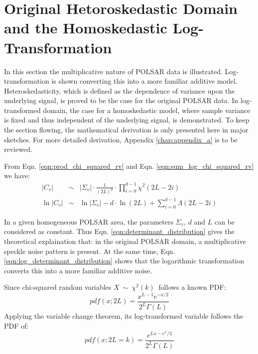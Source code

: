 \documentclass[journal]{IEEEtran}
\begin{document}
\section{Original Hetoroskedastic Domain and the Homoskedastic Log-Transformation}
\label{sec:polsar_heterosked_model_and_log_transform}

In this section the multiplicative nature of POLSAR data is illustrated.
Log-transformation is shown converting this into a more familiar additive model.
Heteroskedasticity, which is defined as the dependence of variance upon the underlying signal,
  is proved to be the case for the original POLSAR data.
In log-transformed domain, the case for a homoskedastic model,
  where sample variance is fixed and thus independent of the underlying signal,
  is demonstrated.
To keep the section flowing, the mathematical derivation is only presented here in major sketches.
For more detailed derivation, Appendix \ref{chap:appendix_a} is to be reviewed.

From Eqn. \ref{eqn:prod_chi_squared_rv} and Eqn. \ref{eqn:sum_log_chi_squared_rv}
we have:
\begin{eqnarray}
  |C_v| &\sim& |\Sigma_v| \cdot \frac{1}{(2L)^d} \cdot \prod_{i=0}^{d-1} \chi^2 (2L-2i) \label{eqn:determinant_distribution} \\
  \ln|C_v| &\sim& \ln|\Sigma_v| - d \cdot \ln(2L) + \sum^{d-1}_{i=0} \Lambda(2L-2i)
\label{eqn:log_determinant_distribution}  
\end{eqnarray}

In a given homogeneous POLSAR area, the parameters $\Sigma_v$, $d$ and $L$ can be considered as constant.
Thus Eqn. \ref{eqn:determinant_distribution} gives the theoretical explaination that: 
  in the original POLSAR domain, a multiplicative speckle noise pattern is present.
At the same time, Eqn. \ref{eqn:log_determinant_distribution} shows that
  the logarithmic transformation converts this into a more familiar additive noise.  

Since chi-squared random variables $X\ \sim\ \chi^2(k)\ $ follows a known PDF:
\begin{equation}
pdf(x;2L) =
  \frac{x^{L-1} e^{-x/2}}{2^L \Gamma\left(L\right)}
\label{eqn:chi_squared_dist_pdf:chap4}
\end{equation}
Applying the variable change theorem, 
  its log-transformed variable follows the PDF of:
\begin{equation}
  pdf(x;2L=k) = \frac{e^{Lx-e^x/2}}{2^{L}\Gamma(L)}
\end{equation}
\end{document}
